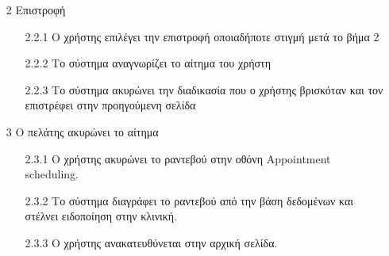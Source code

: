 \documentclass[12pt,a4paper,twoside]{book}
\begin{document}
\begin{enumerate}
  \item[2 ] Επιστροφή
        \begin{enumerate}
          \item[2.2.1 ] Ο χρήστης επιλέγει την επιστροφή οποιαδήποτε στιγμή μετά το βήμα 2 %
          \item[2.2.2 ] Το σύστημα αναγνωρίζει το αίτημα του χρήστη %
          \item[2.2.3 ] Το σύστημα ακυρώνει την διαδικασία που ο χρήστης βρισκόταν και τον επιστρέφει στην προηγούμενη σελίδα %
        \end{enumerate}
  \item[3 ] Ο πελάτης ακυρώνει το αίτημα
        \begin{enumerate}
          \item[2.3.1 ] Ο χρήστης  ακυρώνει το ραντεβού στην οθόνη Appointment scheduling. %
          \item[2.3.2 ] Το σύστημα διαγράφει το ραντεβού από την βάση δεδομένων και στέλνει ειδοποίηση στην κλινική. %
          \item[2.3.3 ] Ο χρήστης  ανακατευθύνεται στην αρχική σελίδα. %
        \end{enumerate}
\end{enumerate}
\end{document}

